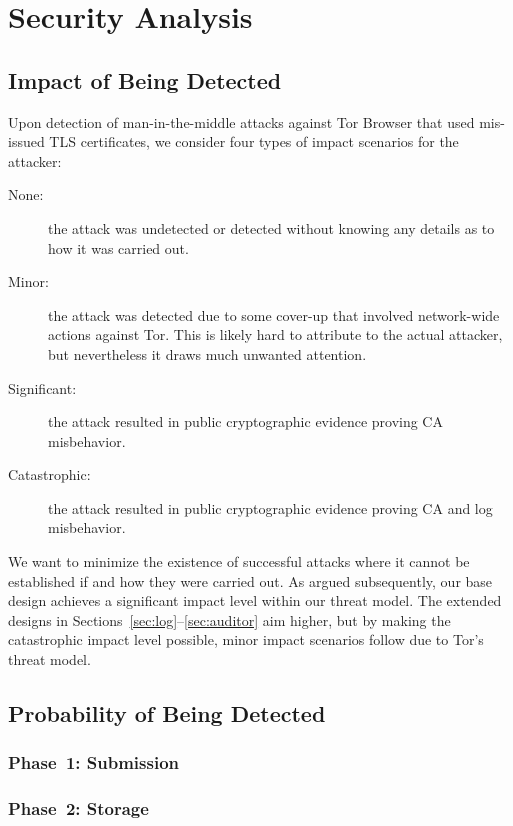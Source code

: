 \section{Security Analysis} \label{sec:analysis}

\subsection{Impact of Being Detected} \label{sec:analysis:impact}
Upon detection of man-in-the-middle attacks against Tor Browser that used 
mis-issued TLS certificates, we consider four types of impact scenarios for the
attacker:
\begin{description}
	\item[None:] the attack was undetected or detected without knowing any
		details as to how it was carried out.
	\item[Minor:] the attack was detected due to some cover-up that involved
		network-wide actions against Tor.  This is likely hard to attribute to
		the actual attacker, but nevertheless it draws much unwanted attention.
	\item[Significant:] the attack resulted in public cryptographic evidence
		proving CA misbehavior.
	\item[Catastrophic:] the attack resulted in public cryptographic evidence
		proving CA and log misbehavior.
\end{description}

We want to minimize the existence of successful attacks where it cannot be
established if and how they were carried out.  As argued subsequently, our
base design achieves a significant impact level within our threat model.  The
extended designs in Sections~\ref{sec:log}--\ref{sec:auditor} aim higher, but by
making the catastrophic impact level possible, minor impact scenarios follow due
to Tor's threat model.

\subsection{Probability of Being Detected} \label{sec:analysis:pr}
\subsubsection{Phase~1: Submission} \label{sec:analysis:pr:phase1}
\subsubsection{Phase~2: Storage} \label{sec:analysis:pr:phase2}
